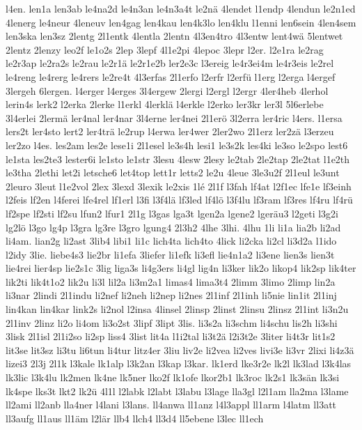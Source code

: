 {l4en.
len1a
len3ab
le4na2d
le4n3an
le4n3a4t
le2nä
4lendet
l1endp
4lendun
le2n1ed
4lenerg
le4neur
4leneuv
len4gag
len4kau
len4k3lo
len4klu
l1enni
len6sein
4len4sem
len3ska
len3sz
2lentg
2l1entk
4lentla
2lentn
4l3en4tro
4l3entw
lent4wä
5lentwet
2lentz
2lenzy
leo2f
le1o2s
2lep
3lepf
4l1e2pi
4lepoc
3lepr
l2er.
l2e1ra
le2rag
le2r3ap
le2ra2s
le2rau
le2r1ä
le2r1e2b
ler2e3c
l3ereig
le4r3ei4m
le4r3eis
le2rel
le4reng
le4rerg
le4rers
le2re4t
4l3erfas
2l1erfo
l2erfr
l2erfü
l1erg
l2erga
l4ergef
3lergeh
6lergen.
l4erger
l4erges
3l4ergew
2lergi
l2ergl
l2ergr
4ler4heb
4lerhol
lerin4s
lerk2
l2erka
2lerke
l1erkl
4lerklä
l4erkle
l2erko
ler3kr
ler3l
5l6erlebe
3l4erlei
2lermä
ler4nal
ler4nar
3l4erne
ler4nei
2l1erö
3l2erra
ler4ric
l4ers.
l1ersa
lers2t
ler4sto
lert2
ler4trä
le2rup
l4erwa
ler4wer
2ler2wo
2l1erz
ler2zä
l3erzeu
ler2zo
l4es.
les2am
les2e
lese1i
2l1esel
le3s4h
lesi1
le3s2k
les4ki
le3so
le2spo
lest6
le1sta
les2te3
lester6i
le1sto
le1str
3lesu
4lesw
2lesy
le2tab
2le2tap
2le2tat
l1e2th
le3tha
2lethi
let2i
letsche6
let4top
lett1r
letts2
le2u
4leue
3le3u2f
2l1eul
le3unt
2leuro
3leut
l1e2vol
2lex
3lexd
3lexik
le2xis
1lé
2l1f
l3fah
lf4at
l2f1ec
lfe1e
lf3einh
l2feis
lf2en
l4ferei
lfe4rel
lf1erl
l3fi
l3f4lä
lf3led
lf4lö
l3f4lu
lf3ram
lf3res
lf4ru
lf4rü
lf2spe
lf2sti
lf2su
lfun2
lfur1
2l1g
l3gas
lga3t
lgen2a
lgene2
lgeräu3
l2geti
l3g2i
lg2lö
l3go
lg4p
l3gra
lg3re
l3gro
lgung4
2l3h2
4lhe
3lhi.
4lhu
1li
li1a
lia2b
li2ad
li4am.
lian2g
li2ast
3lib4
libi1
li1c
lich4ta
lich4to
4lick
li2cka
li2cl
li3d2a
l1ido
l2idy
3lie.
liebe4s3
lie2br
li1efa
3liefer
li1efk
li3efl
lie4n1a2
li3ene
lien3s
lien3t
lie4rei
lier4sp
lie2s1c
3lig
liga3s
li4g3ers
li4gl
lig4n
li3ker
lik2o
likop4
lik2sp
lik4ter
lik2ti
lik4t1o2
lik2u
li3l
lil2a
li3m2a1
limas4
lima3t4
2limm
3limo
2limp
lin2a
li3nar
2lindi
2l1indu
li2nef
li2neh
li2nep
li2nes
2l1inf
2l1inh
li5nie
lin1it
2l1inj
lin4kan
lin4kar
link2s
li2nol
l2insa
4linsel
2linsp
2linst
2linsu
2linsz
2l1int
li3n2u
2l1inv
2linz
li2o
li4om
li3o2st
3lipf
3lipt
3lis.
li3s2a
li3schm
li4schu
lis2h
li3shi
3lisk
2l1isl
2l1i2so
li2sp
liss4
3list
lit4a
l1i2tal
li3t2ä
l2i3t2e
3liter
li4t3r
lit1s2
lit3se
lit3sz
li3tu
li6tun
li4tur
litz4er
3liu
liv2e
li2vea
li2ves
livi3e
li3vr
2lixi
li4z3ä
lizei3
2l3j
2l1k
l3kale
lk1alp
l3k2an
l3kap
l3kar.
lk1erd
lke3r2e
lk2l
lk3lad
l3k4las
lk3lic
l3k4lu
lk2men
lk4ne
lk5ner
lko2f
lk1ofe
lkor2b1
lk3roc
lk2s1
lk3sän
lk3si
lk4spe
lks3t
lkt2
lk2ü
4l1l
l2labk
l2labt
l3labu
l3lage
lla3gl
l2l1am
lla2ma
l3lame
ll2ami
ll2anb
lla4ner
l4lani
l3lans.
ll4anwa
ll1anz
l4l3appl
ll1arm
l4latm
ll3att
ll3aufg
ll1aus
ll1äm
l2lär
llb4
llch4
ll3d4
ll5ebene
l3lec
ll1ech
}
